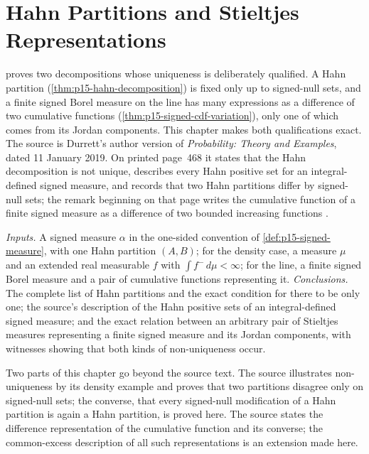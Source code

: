 \chapter{Hahn Partitions and Stieltjes Representations}
\label{sec:p15-w02b-p15-005-hahn-stieltjes}

 proves two decompositions whose
uniqueness is deliberately qualified. A Hahn partition
(\cref{thm:p15-hahn-decomposition}) is fixed only up to signed-null
sets, and a finite signed Borel measure on the line has many expressions
as a difference of two cumulative functions
(\cref{thm:p15-signed-cdf-variation}), only one of which comes from its
Jordan components. This chapter makes both qualifications exact. The
source is Durrett's author version of \emph{Probability: Theory and
Examples}, dated 11 January 2019. On printed page~468 it states that the
Hahn decomposition is not unique, describes every Hahn positive set for
an integral-defined signed measure, and records that two Hahn partitions
differ by signed-null sets; the remark beginning on that page writes the
cumulative function of a finite signed measure as a difference of two
bounded increasing functions \cite[pp.~468--469]{DurrettPTEAuthor2019}.

\emph{Inputs.} A signed measure \(\alpha\) in the one-sided convention
of \cref{def:p15-signed-measure}, with one Hahn partition \((A,B)\);
for the density case, a measure \(\mu\) and an extended real measurable
\(f\) with \(\int f^-\,d\mu<\infty\); for the line, a finite signed
Borel measure and a pair of cumulative functions representing it.
\emph{Conclusions.} The complete list of Hahn partitions and the exact
condition for there to be only one; the source's description of the
Hahn positive sets of an integral-defined signed measure; and the exact
relation between an arbitrary pair of Stieltjes measures representing a
finite signed measure and its Jordan components, with witnesses showing
that both kinds of non-uniqueness occur.

Two parts of this chapter go beyond the source text. The source
illustrates non-uniqueness by its density example and proves that
two partitions disagree only on signed-null sets; the converse, that every
signed-null modification of a Hahn partition is again a Hahn partition,
is proved here. The source states the difference representation of the
cumulative function and its converse; the common-excess description of
all such representations is an extension made here.


